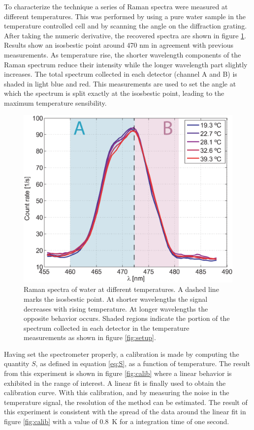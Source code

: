 \documentclass[twocolumn]{svjour3}       %
\begin{document}
To characterize the technique a series of Raman spectra were measured at different temperatures. This was performed by using a pure water sample in the temperature controlled cell and by scanning the angle on the diffraction grating. After taking the numeric derivative, the recovered spectra are shown in figure \ref{fig:spectra}. Results show an isosbestic point around 470 nm in agreement with previous measurements\cite{walrafen1}. As temperature rise, the shorter wavelength components of the Raman spectrum reduce their intensity while the longer wavelength part slightly increases. The total spectrum collected in each detector (channel A and B) is shaded in light blue and red. This measurements are used to set the angle at which the spectrum is split exactly at the isosbestic point, leading to the maximum temperature sensibility. 

\begin{figure}[h!]
\centering
\includegraphics[width=\columnwidth]{figs/fig2.eps}
\caption{Raman spectra of water at different temperatures. A dashed line marks the isosbestic point. At shorter wavelengths the signal decreases with rising temperature. At longer wavelengths the opposite behavior occurs. Shaded regions indicate the portion of the spectrum collected in each detector in the temperature measurements as shown in figure \ref{fig:setup}.\label{fig:spectra}}
\end{figure}

Having set the spectrometer properly, a calibration is made by computing the quantity $S$, as defined in equation \ref{eq:S}, as a function of temperature. The result from this experiment is shown in figure \ref{fig:calib} where a linear behavior is exhibited in the range of interest. A linear fit is finally used to obtain the calibration curve. With this calibration, and by measuring the noise in the temperature signal, the resolution of the method can be estimated. The result of this experiment is consistent with the spread of the data around the linear fit in figure \ref{fig:calib} with a value of 0.8~K for a integration time of one second.
\end{document}

